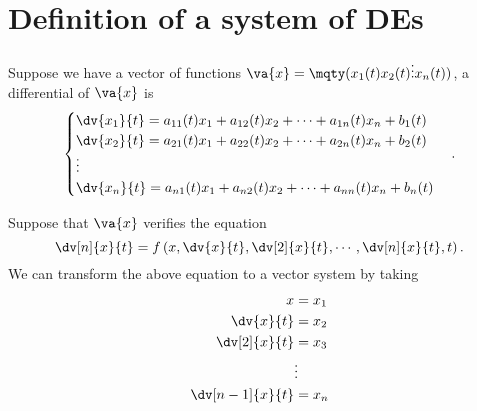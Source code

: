 \part{Definition of a system of DEs}

Suppose we have a vector of functions $\va{x}=\mqty(x_1(t)\\x_2(t)\\\vdots\\x_n(t))$, a differential of $\va{x}$ is
\[
	\begin{cases}
		\dv{x_1}{t} = a_{11}(t)x_1+a_{12}(t)x_2+\cdots+a_{1n}(t)x_n+b_1(t) \\
		\dv{x_2}{t} = a_{21}(t)x_1+a_{22}(t)x_2+\cdots+a_{2n}(t)x_n+b_2(t) \\
		\vdots                                                             \\
		\dv{x_n}{t} = a_{n1}(t)x_1+a_{n2}(t)x_2+\cdots+a_{nn}(t)x_n+b_n(t) \\
	\end{cases}
	.\]

Suppose that $\va{x}$ verifies the equation
\[
	\dv[n]{x}{t} =f\left( x,\dv{x}{t}, \dv[2]{x}{t}, \cdots, \dv[n]{x}{t}, t  \right)
	.\]
We can transform the above equation to a vector system by taking
\begin{align*}
	x              & = x_1  \\
	\dv{x}{t}      & = x_2  \\
	\dv[2]{x}{t}   & = x_3  \\
	               & \vdots \\
	\dv[n-1]{x}{t} & = x_n
\end{align*}
